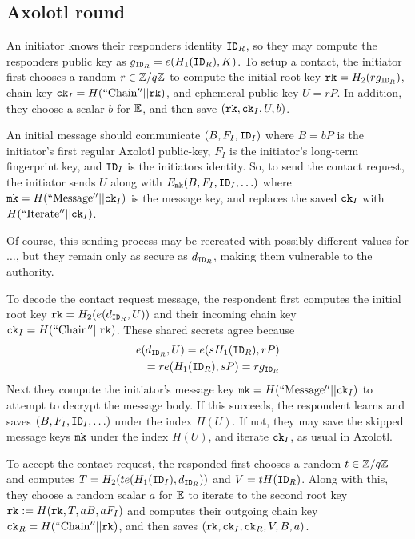 \documentclass[twoside,letterpaper]{sig-alternate}
\begin{document}
\subsection{Axolotl round} %

An initiator knows their responders identity $\mathtt{ID}_R$, so they may
compute the responders public key as $g_{\mathtt{ID}_R} = e(H_1(\mathtt{ID}_R),K)$.
To setup a contact, the initiator first chooses a random $r \in \mathbb{Z}/q\mathbb{Z}$
to compute the initial root key $\mathtt{rk} = H_2( r g_{\mathtt{ID}_R} )$,
chain key $\mathtt{ck}_I = H(\mathrm{``Chain''} || \mathtt{rk})$, and
ephemeral public key $U = r P$.
In addition, they choose a scalar $b$ for $\mathbb{E}$,
 and then save $(\mathtt{rk},\mathtt{ck}_I,U,b)$.

An initial message should communicate $(B,F_I,\mathtt{ID}_I)$ where
 $B = b P$ is the initiator's first regular Axolotl public-key,
 $F_I$ is the initiator's long-term fingerprint key, and
 $\mathtt{ID}_I$ is the initiators identity.
So, to send the contact request, the initiator
sends $U$ along with $E_{\mathtt{mk}}(B,F_I,\mathtt{ID}_I,\ldots)$ where
 $\mathtt{mk} = H(\mathrm{``Message''}  || \mathtt{ck}_I)$ is the message key,
and replaces the saved $\mathtt{ck}_I$ with $H(\mathrm{``Iterate''} || \mathtt{ck}_I)$.

Of course, this sending process may be recreated with possibly different
values for $\ldots$, but they remain only as secure as $d_{\mathtt{ID}_R}$,
making them vulnerable to the authority.

\smallskip

To decode the contact request message, the respondent
first computes the initial root key $\mathtt{rk} = H_2( e(d_{\mathtt{ID}_R}, U) )$
and their incoming chain key $\mathtt{ck}_I = H(\mathrm{``Chain''} || \mathtt{rk})$.
These shared secrets agree because
\begin{align*}
e(d_{\mathtt{ID}_R}, U) = e(s H_1(\mathtt{ID}_R), r P) \\
 \quad = r e(H_1(\mathtt{ID}_R), s P) = r g_{\mathtt{ID}_R}
\end{align*}
Next they compute the initiator's
 message key $\mathtt{mk} = H(\mathrm{``Message''}  || \mathtt{ck}_I)$
to attempt to decrypt the message body.
If this succeeds, the respondent learns and saves $(B,F_I,\mathtt{ID}_I,\ldots)$
 under the index $H(U)$.
If not, they may save the skipped message keys $\mathtt{mk}$ under
the index $H(U)$, and iterate $\mathtt{ck}_I$, as usual in Axolotl.

To accept the contact request,
the responded first chooses a random $t \in \mathbb{Z}/q\mathbb{Z}$ and
 computes $T = H_2( t e(H_1(\mathtt{ID}_I),d_{\mathtt{ID}_R}) )$ and $V = t H(\mathtt{ID}_R)$.
Along with this, they choose a random scalar $a$ for $\mathbb{E}$ to
iterate to the second root key $\mathtt{rk} := H(\mathtt{rk}, T, a B, a F_I)$ and
 computes their outgoing chain key $\mathtt{ck}_R = H(\mathrm{``Chain''} || \mathtt{rk})$,
and then saves $(\mathtt{rk},\mathtt{ck}_I,\mathtt{ck}_R,V,B,a)$.
\end{document}

